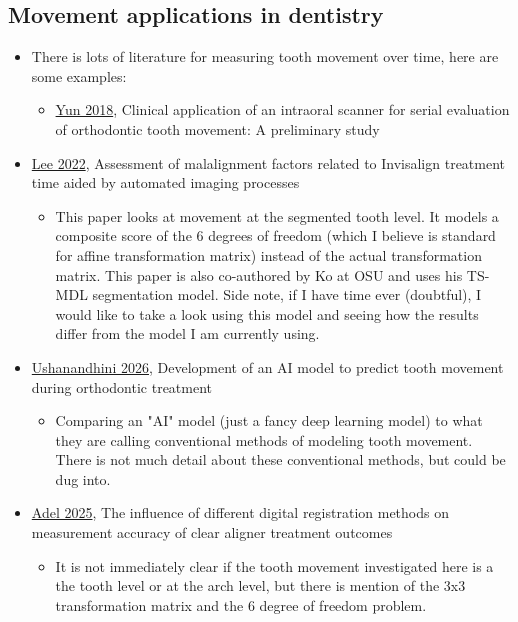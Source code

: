 \documentclass[11pt]{article}
\theoremstyle{definition}
\begin{document}
\subsection{Movement applications in dentistry}
\begin{itemize}
    \item There is lots of literature for measuring tooth movement over time, here are some examples:
    \begin{itemize}
        \item \href{https://pmc.ncbi.nlm.nih.gov/articles/PMC6041451/}{Yun 2018}, Clinical application of an intraoral scanner for serial evaluation of orthodontic tooth movement: A preliminary study
    \end{itemize}
    \item \href{https://pmc.ncbi.nlm.nih.gov/articles/PMC9933556/}{Lee 2022}, Assessment of malalignment factors related to Invisalign treatment time aided by automated imaging processes
    \begin{itemize}
        \item This paper looks at movement at the segmented tooth level. It models a composite score of the 6 degrees of freedom (which I believe is standard for affine transformation matrix) instead of the actual transformation matrix. This paper is also co-authored by Ko at OSU and uses his TS-MDL segmentation model. Side note, if I have time ever (doubtful), I would like to take a look using this model and seeing how the results differ from the model I am currently using.
    \end{itemize} 
    \item \href{https://pmc.ncbi.nlm.nih.gov/articles/PMC13150245/}{Ushanandhini 2026}, Development of an AI model to predict tooth movement during orthodontic treatment
    \begin{itemize}
        \item Comparing an "AI" model (just a fancy deep learning model) to what they are calling conventional methods of modeling tooth movement. There is not much detail about these conventional methods, but could be dug into.
    \end{itemize}
    \item \href{https://link.springer.com/article/10.1186/s12903-025-07494-x}{Adel 2025}, The influence of different digital registration methods on measurement accuracy of clear aligner treatment outcomes
    \begin{itemize}
        \item It is not immediately clear if the tooth movement investigated here is a the tooth level or at the arch level, but there is mention of the 3x3 transformation matrix and the 6 degree of freedom problem. 

\end{itemize}
\end{itemize}
\end{document}
